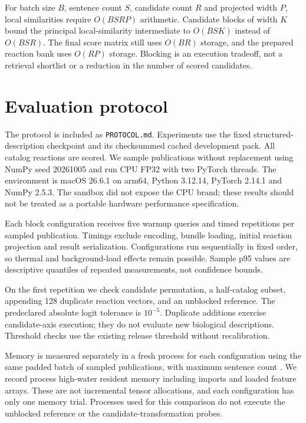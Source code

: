 \documentclass[11pt,a4paper]{article}
\begin{document}
For batch size $B$, sentence count $S$, candidate count $R$ and projected width
$P$, local similarities require $O(BSRP)$ arithmetic. Candidate blocks of width
$K$ bound the principal local-similarity intermediate to $O(BSK)$ instead of
$O(BSR)$. The final score matrix still uses $O(BR)$ storage, and the prepared
reaction bank uses $O(RP)$ storage. Blocking is an execution tradeoff, not a
retrieval shortlist or a reduction in the number of scored candidates.

\section{Evaluation protocol}
The protocol is included as \texttt{PROTOCOL.md}. Experiments use the fixed
structured-description checkpoint and its checksummed cached development pack.
All \CatalogCount{} catalog reactions are scored. We sample \SampleCount{} publications
without replacement using NumPy seed 20261005 and run CPU FP32 with two PyTorch
threads. The environment is macOS 26.6.1 on arm64, Python 3.12.14, PyTorch 2.14.1
and NumPy 2.5.3. The sandbox did not expose the CPU brand; these results should
not be treated as a portable hardware performance specification.

Each block configuration receives five warmup queries and \RepeatCount{} timed repetitions
per sampled publication. Timings exclude encoding, bundle loading, initial
reaction projection and result serialization. Configurations run sequentially in
fixed order, so thermal and background-load effects remain possible. Sample p95
values are descriptive quantiles of repeated measurements, not confidence bounds.

On the first repetition we check candidate permutation, a half-catalog subset,
appending 128 duplicate reaction vectors, and an unblocked reference. The
predeclared absolute logit tolerance is $10^{-5}$. Duplicate additions exercise
candidate-axis execution; they do not evaluate new biological descriptions.
Threshold checks use the existing release threshold without recalibration.

Memory is measured separately in a fresh process for each configuration using
the same padded batch of \MemoryBatch{} sampled publications, with maximum sentence count \MemorySpans{}.
We record process high-water resident memory including imports and loaded feature
arrays. These are not incremental tensor allocations, and each configuration has
only one memory trial. Processes used for this comparison do not execute the
unblocked reference or the candidate-transformation probes.
\end{document}
